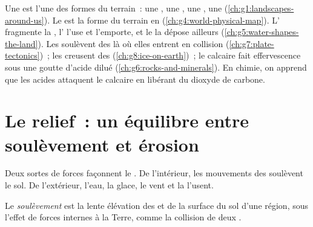 \begin{recall}
Une \emph{} est l'une des formes du terrain~: une ,
une , une , une  (\cref{ch:g1:landscapes-around-us}). Le
 est la forme du terrain en  (\cref{ch:g4:world-physical-map}).
L' fragmente la , l' l'use et l'emporte, et le 
la dépose ailleurs (\cref{ch:g5:water-shapes-the-land}). Les 
soulèvent des  là où elles entrent en collision
(\cref{ch:g7:plate-tectonics})~; les  creusent des 
(\cref{ch:g8:ice-on-earth})~; le calcaire fait effervescence sous une goutte
d'acide dilué (\cref{ch:g6:rocks-and-minerals}). En chimie, on apprend que
les acides attaquent le calcaire en libérant du dioxyde de carbone.
\end{recall}

\section{Le relief~: un équilibre entre soulèvement et érosion}

Deux sortes de forces façonnent le . De l'intérieur, les mouvements
des  soulèvent le sol. De l'extérieur, l'eau, la glace, le vent et
la  l'usent.

\begin{definition}[Soulèvement]\label{def:g9:landforms:uplift}
Le \emph{soulèvement} est la lente élévation des  et de la
surface du sol d'une région, sous l'effet de forces internes à la Terre,
comme la collision de deux .
\end{definition}

